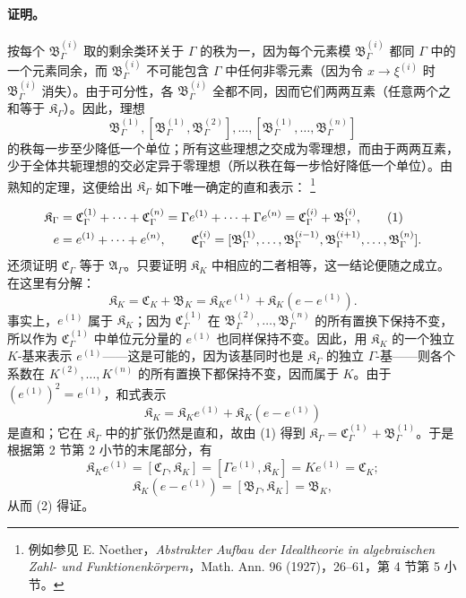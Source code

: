 \documentclass[11pt]{article}
\providecommand{\srcfn}[2]{%
  \begingroup
  \renewcommand{\thefootnote}{#1}%
  \footnote{#2}%
  \addtocounter{footnote}{-1}%
  \endgroup}
\begin{document}
\paragraph{证明。}
按每个 $\mathfrak B_\Gamma^{(i)}$ 取的剩余类环关于 $\Gamma$ 的秩为一，因为每个元素模 $\mathfrak B_\Gamma^{(i)}$ 都同 $\Gamma$ 中的一个元素同余，而 $\mathfrak B_\Gamma^{(i)}$ 不可能包含 $\Gamma$ 中任何非零元素（因为令 $x\to\xi^{(i)}$ 时 $\mathfrak B_\Gamma^{(i)}$ 消失）。由于可分性，各 $\mathfrak B_\Gamma^{(i)}$ 全都不同，因而它们两两互素（任意两个之和等于 $\mathfrak K_\Gamma$）。因此，理想
\[
\mathfrak B_\Gamma^{(1)},
[\mathfrak B_\Gamma^{(1)},\mathfrak B_\Gamma^{(2)}],\ldots,
[\mathfrak B_\Gamma^{(1)},\ldots,\mathfrak B_\Gamma^{(n)}]
\]
的秩每一步至少降低一个单位；所有这些理想之交成为零理想，而由于两两互素，少于全体共轭理想的交必定异于零理想（所以秩在每一步恰好降低一个单位）。由熟知的定理，这便给出 $\mathfrak K_\Gamma$ 如下唯一确定的直和表示：\srcfn{17)}{例如参见 E. Noether，\emph{Abstrakter Aufbau der Idealtheorie in algebraischen Zahl- und Funktionenkörpern}，Math. Ann. 96 (1927)，26--61，第 4 节第 5 小节。}
\begin{align}
\mathfrak K_\Gamma
&=\mathfrak C_\Gamma^{(1)}+\cdots+\mathfrak C_\Gamma^{(n)}
=\Gamma e^{(1)}+\cdots+\Gamma e^{(n)}
=\mathfrak C_\Gamma^{(i)}+\mathfrak B_\Gamma^{(i)}, \tag{1}\\
e&=e^{(1)}+\cdots+e^{(n)},\qquad
\mathfrak C_\Gamma^{(i)}=
[\mathfrak B_\Gamma^{(1)},\ldots,\mathfrak B_\Gamma^{(i-1)},
\mathfrak B_\Gamma^{(i+1)},\ldots,\mathfrak B_\Gamma^{(n)}].\notag
\end{align}
还须证明 $\mathfrak C_\Gamma$ 等于 $\mathfrak A_\Gamma$。只要证明 $\mathfrak K_K$ 中相应的二者相等，这一结论便随之成立。在这里有分解：
\begin{equation}
\mathfrak K_K=\mathfrak C_K+\mathfrak B_K
=\mathfrak K_K e^{(1)}+\mathfrak K_K(e-e^{(1)}). \tag{2}
\end{equation}
事实上，$e^{(1)}$ 属于 $\mathfrak K_K$；因为 $\mathfrak C_\Gamma^{(1)}$ 在 $\mathfrak B_\Gamma^{(2)},\ldots,\mathfrak B_\Gamma^{(n)}$ 的所有置换下保持不变，所以作为 $\mathfrak C_\Gamma^{(1)}$ 中单位元分量的 $e^{(1)}$ 也同样保持不变。因此，用 $\mathfrak K_K$ 的一个独立 $K$-基来表示 $e^{(1)}$——这是可能的，因为该基同时也是 $\mathfrak K_\Gamma$ 的独立 $\Gamma$-基——则各个系数在 $K^{(2)},\ldots,K^{(n)}$ 的所有置换下都保持不变，因而属于 $K$。由于 $(e^{(1)})^2=e^{(1)}$，和式表示
\[
\mathfrak K_K=\mathfrak K_K e^{(1)}+\mathfrak K_K(e-e^{(1)})
\]
是直和；它在 $\mathfrak K_\Gamma$ 中的扩张仍然是直和，故由 (1) 得到 $\mathfrak K_\Gamma=\mathfrak C_\Gamma^{(1)}+\mathfrak B_\Gamma^{(1)}$。于是根据第 2 节第 2 小节的末尾部分，有
\[
\mathfrak K_K e^{(1)}=[\mathfrak C_\Gamma,\mathfrak K_K]
=[\Gamma e^{(1)},\mathfrak K_K]=Ke^{(1)}=\mathfrak C_K;
\]
\[
\mathfrak K_K(e-e^{(1)})=[\mathfrak B_\Gamma,\mathfrak K_K]=\mathfrak B_K,
\]
从而 (2) 得证。
\end{document}
